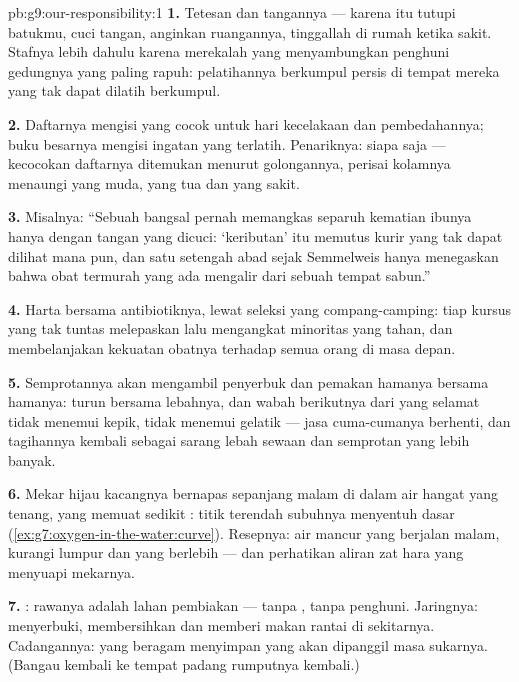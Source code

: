 \begin{solution}{pb:g9:our-responsibility:1}
\textbf{1.} Tetesan dan tangannya --- karena itu tutupi
batukmu, cuci tangan, anginkan ruangannya, tinggallah di
rumah ketika sakit. Stafnya lebih dahulu karena merekalah
yang menyambungkan penghuni gedungnya yang paling rapuh:
pelatihannya berkumpul persis di tempat mereka yang tak
dapat dilatih berkumpul.

\textbf{2.} Daftarnya mengisi  yang cocok untuk hari
kecelakaan dan pembedahannya; buku besarnya mengisi ingatan
yang terlatih. Penariknya: siapa saja --- kecocokan
daftarnya ditemukan menurut golongannya, perisai kolamnya
menaungi yang muda, yang tua dan yang sakit.

\textbf{3.} Misalnya: ``Sebuah bangsal pernah memangkas
separuh kematian ibunya hanya dengan tangan yang dicuci:
`keributan' itu memutus kurir yang tak dapat dilihat 
mana pun, dan satu setengah abad sejak Semmelweis hanya
menegaskan bahwa obat termurah yang ada mengalir dari sebuah
tempat sabun.''

\textbf{4.} Harta bersama antibiotiknya, lewat seleksi yang
compang-camping: tiap kursus yang tak tuntas melepaskan lalu
mengangkat minoritas yang tahan, dan membelanjakan kekuatan
obatnya terhadap  semua orang di masa depan.

\textbf{5.} Semprotannya akan mengambil penyerbuk dan
pemakan hamanya bersama hamanya:   turun
bersama lebahnya, dan wabah berikutnya dari yang selamat
tidak menemui kepik, tidak menemui  gelatik --- jasa
cuma-cumanya berhenti, dan tagihannya kembali sebagai sarang
lebah sewaan dan semprotan yang lebih banyak.

\textbf{6.} Mekar hijau kacangnya bernapas sepanjang malam
di dalam air hangat yang tenang, yang memuat sedikit :
titik terendah subuhnya menyentuh dasar
(\cref{ex:g7:oxygen-in-the-water:curve}). Resepnya: air
mancur yang berjalan malam, kurangi lumpur dan  yang
berlebih --- dan perhatikan aliran zat hara yang menyuapi
mekarnya.

\textbf{7.} : rawanya adalah lahan pembiakan ---
tanpa , tanpa penghuni. Jaringnya: 
menyerbuki, membersihkan dan memberi makan rantai di
sekitarnya. Cadangannya:  yang beragam menyimpan
 yang akan dipanggil masa sukarnya. (Bangau kembali ke
tempat padang rumputnya kembali.)


\end{solution}
